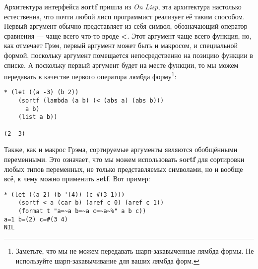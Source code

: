 Архитектура интерфейса \textbf{sortf} пришла из \emph{On Lisp}, эта архитектура настолько естественна, что почти любой лисп программист реализует её таким способом. Первый аргумент обычно представляет из себя символ, обозначающий оператор сравнения --- чаще всего что-то вроде \textbf{<}. Этот аргумент чаще всего функция, но, как отмечает Грэм, первый аргумент может быть и макросом, и специальной формой, поскольку аргумент помещается непосредственно на позицию функции в списке. А поскольку первый аргумент будет на месте функции, то мы можем передавать в качестве первого оператора лямбда форму\footnote{Заметьте, что мы не можем передавать шарп-закавыченные лямбда формы. Не используйте шарп-закавычивание для ваших лямбда форм.}:

\begin{verbatim}
* (let ((a -3) (b 2))
    (sortf (lambda (a b) (< (abs a) (abs b)))
      a b)
    (list a b))

(2 -3)
\end{verbatim}

Также, как и макрос Грэма, сортируемые аргументы являются обобщёнными переменными. Это означает, что мы можем использовать \textbf{sortf} для сортировки любых типов переменных, не только представляемых символами, но и вообще всё, к чему можно применить \textbf{setf}. Вот пример:

\begin{verbatim}
* (let ((a 2) (b '(4)) (c #(3 1)))
    (sortf < a (car b) (aref c 0) (aref c 1))
    (format t "a=~a b=~a c=~a~%" a b c))
a=1 b=(2) c=#(3 4)
NIL
\end{verbatim}


